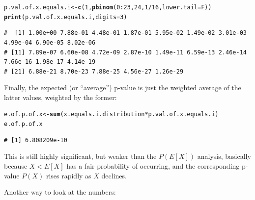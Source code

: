 \documentclass{article}\usepackage[]{graphicx}\usepackage[]{color}
\makeatletter
\newcommand{\hlnum}[1]{\textcolor[rgb]{0.686,0.059,0.569}{#1}}%
\newcommand{\hlopt}[1]{\textcolor[rgb]{0,0,0}{#1}}%
\newcommand{\hlstd}[1]{\textcolor[rgb]{0.345,0.345,0.345}{#1}}%
\newcommand{\hlkwb}[1]{\textcolor[rgb]{0.69,0.353,0.396}{#1}}%
\newcommand{\hlkwc}[1]{\textcolor[rgb]{0.333,0.667,0.333}{#1}}%
\newcommand{\hlkwd}[1]{\textcolor[rgb]{0.737,0.353,0.396}{\textbf{#1}}}%
\newenvironment{kframe}{%
 \def\at@end@of@kframe{}%
 \ifinner\ifhmode%
  \def\at@end@of@kframe{\end{minipage}}%
  \begin{minipage}{\columnwidth}%
 \fi\fi%
 \def\FrameCommand##1{\hskip\@totalleftmargin \hskip-\fboxsep
 \colorbox{shadecolor}{##1}\hskip-\fboxsep
     \hskip-\linewidth \hskip-\@totalleftmargin \hskip\columnwidth}%
 \MakeFramed {\advance\hsize-\width
   \@totalleftmargin\z@ \linewidth\hsize
   \@setminipage}}%
 {\par\unskip\endMakeFramed%
 \at@end@of@kframe}
\newenvironment{knitrout}{}{} %
\makeatother
\begin{document}
\begin{enumerate}
\begin{knitrout}\footnotesize
{}\color{fgcolor}\begin{kframe}
\begin{alltt}
\hlstd{p.val.of.x.equals.i} \hlkwb{<-} \hlkwd{c}\hlstd{(}\hlnum{1}\hlstd{,} \hlkwd{pbinom}\hlstd{(}\hlnum{0}\hlopt{:}\hlnum{23}\hlstd{,} \hlnum{24}\hlstd{,} \hlnum{1}\hlopt{/}\hlnum{16}\hlstd{,} \hlkwc{lower.tail} \hlstd{= F))}
\hlkwd{print}\hlstd{(p.val.of.x.equals.i,} \hlkwc{digits}\hlstd{=}\hlnum{3}\hlstd{)}
\end{alltt}
\begin{verbatim}
#  [1] 1.00e+00 7.88e-01 4.48e-01 1.87e-01 5.95e-02 1.49e-02 3.01e-03 4.99e-04 6.90e-05 8.02e-06
# [11] 7.89e-07 6.60e-08 4.72e-09 2.87e-10 1.49e-11 6.59e-13 2.46e-14 7.66e-16 1.98e-17 4.14e-19
# [21] 6.88e-21 8.70e-23 7.88e-25 4.56e-27 1.26e-29
\end{verbatim}
\end{kframe}
\end{knitrout}

Finally, the expected (or ``average'') p-value is just the weighted average of the latter values, weighted by the former:

\begin{knitrout}\footnotesize
{}\color{fgcolor}\begin{kframe}
\begin{alltt}
\hlstd{e.of.p.of.x} \hlkwb{<-} \hlkwd{sum}\hlstd{(x.equals.i.distribution} \hlopt{*} \hlstd{p.val.of.x.equals.i)}
\hlstd{e.of.p.of.x}
\end{alltt}
\begin{verbatim}
# [1] 6.808209e-10
\end{verbatim}
\end{kframe}
\end{knitrout}

This is still highly significant, but weaker than the $P(E[X])$ analysis, basically because $X<E[X]$ has a fair probability of occurring, and the corresponding p-value $P(X)$ rises rapidly as $X$ declines.

Another way to look at the numbers:


\end{enumerate}
\end{document}
